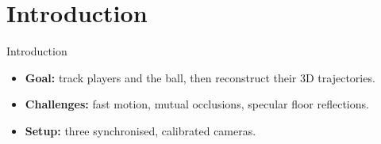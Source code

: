 \section{Introduction}
\label{sec:introduction}
\begin{frame}{Introduction}
\begin{itemize}
  \item \textbf{Goal:} track players and the ball, then reconstruct their 3D trajectories.
  \item \textbf{Challenges:} fast motion, mutual occlusions, specular floor reflections.
  \item \textbf{Setup:} three synchronised, calibrated cameras.
\end{itemize}
\end{frame}
